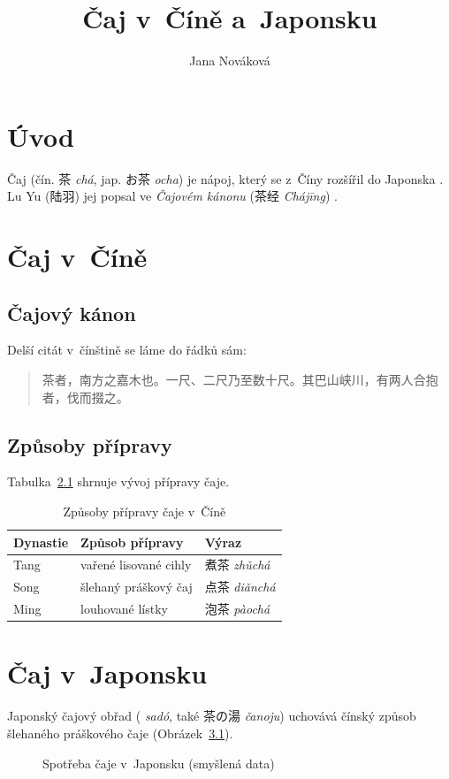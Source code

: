 \documentclass[department=kas, type=ba, language=czech, gender=f, bib=apa]{upolthesis}
\title{Čaj v~Číně a~Japonsku}
\author{Jana Nováková}
\begin{document}

\chapter{Úvod}
Čaj (čín. 茶 \emph{chá}, jap. お茶 \emph{ocha}) je nápoj, který se z~Číny
rozšířil do Japonska \citep{Okakura:1906}. Lu Yu (陆羽) jej popsal ve
\emph{Čajovém kánonu} (茶经 \emph{Chájīng}) \citep{LuYu:1974}.

\chapter{Čaj v~Číně}
\section{Čajový kánon}
Delší citát v~čínštině se láme do řádků sám:

\begin{quote}
茶者，南方之嘉木也。一尺、二尺乃至数十尺。其巴山峡川，有两人合抱者，伐而掇之。
\end{quote}

\section{Způsoby přípravy}
Tabulka~\ref{tab:priprava} shrnuje vývoj přípravy čaje.

\begin{table}[htbp]
  \centering
  \begin{tabular}{l l l}
    \toprule
    Dynastie & Způsob přípravy & Výraz \\
    \midrule
    Tang  & vařené lisované cihly & 煮茶 \emph{zhǔchá} \\
    Song  & šlehaný práškový čaj & 点茶 \emph{diǎnchá} \\
    Ming  & louhované lístky     & 泡茶 \emph{pàochá} \\
    \bottomrule
  \end{tabular}
  \caption{Způsoby přípravy čaje v~Číně}
  \label{tab:priprava}
\end{table}

\chapter{Čaj v~Japonsku}
Japonský čajový obřad ( \emph{sadó}, také 茶の湯 \emph{čanoju})
uchovává čínský způsob šlehaného práškového čaje (Obrázek~\ref{fig:dovoz}).

\begin{figure}[htbp]
  \centering
  \caption{Spotřeba čaje v~Japonsku (smyšlená data)}
  \label{fig:dovoz}
\end{figure}
\end{document}
